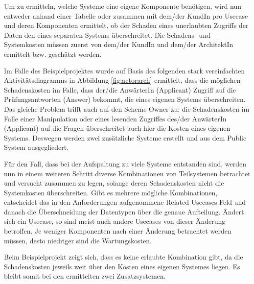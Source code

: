Um zu ermitteln, welche Systeme eine eigene Komponente benötigen, wird nun entweder anhand einer Tabelle oder zusammen mit dem/der KundIn pro Usecase und deren Komponenten ermittelt, ob der Schaden eines unerlaubten Zugriffs der Daten den eines separaten Systems überschreitet. Die Schadens- und Systemkosten müssen zuerst von dem/der KundIn und dem/der ArchitektIn ermittelt bzw. geschätzt werden.

Im Falle des Beispielprojektes wurde auf Basis des folgenden stark vereinfachten Aktivitätsdiagramms in Abbildung \ref{fig:actorarch} ermittelt, dass die möglichen Schadenskosten im Falle, dass der/die AnwärterIn (Applicant) Zugriff auf die Prüfungsantworten (Answer) bekommt, die eines eigenen Systems überschreiten. Das gleiche Problem trifft auch auf den Scheme Owner zu: die Schadenskosten im Falle einer Manipulation oder eines lesenden Zugriffes des/der AnwärterIn (Applicant) auf die Fragen überschreitet auch hier die Kosten eines eigenen Systems. Deswegen werden zwei zusätzliche Systeme erstellt und aus dem Public System ausgegliedert.

Für den Fall, dass bei der Aufspaltung zu viele Systeme entstanden sind, werden nun in einem weiteren Schritt diverse Kombinationen von Teilsystemen betrachtet und versucht zusammen zu legen, solange deren Schadenskosten nicht die Systemkosten überschreiten. Gibt es mehrere mögliche Kombinationen, entscheidet das in den Anforderungen aufgenommene Related Usecases Feld und danach die Überschneidung der Datentypen über die genaue Aufteilung. Ändert sich ein Usecase, so sind meist auch andere Usecases von dieser Änderung betroffen. Je weniger Komponenten nach einer Änderung betrachtet werden müssen, desto niedriger sind die Wartungskosten.

Beim Beispielprojekt zeigt sich, dass es keine erlaubte Kombination gibt, da die Schadenskosten jeweils weit über den Kosten eines eigenen Systemes liegen. Es bleibt somit bei den ermittelten zwei Zusatzsystemen.

